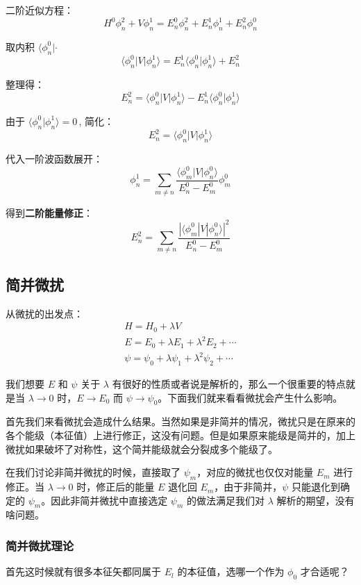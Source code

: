 二阶近似方程：
\[
H^0 \phi_n^2 + V \phi_n^1 = E_n^0 \phi_n^2 + E_n^1 \phi_n^1 + E_n^2 \phi_n^0
\]

取内积 \(\langle \phi_n^0 | \cdot \)
\[
\langle \phi_n^0 | V | \phi_n^1 \rangle = E_n^1\langle \phi_n^0 | \phi_n^1 \rangle + E_n^2
\]

整理得：
\[
E_n^2 = \langle \phi_n^0 | V | \phi_n^1 \rangle - E_n^1 \langle \phi_n^0 | \phi_n^1 \rangle
\]

由于 \(\boxed{\langle \phi_n^0 | \phi_n^1 \rangle = 0}\)\,, 简化：
\[
E_n^2 = \langle \phi_n^0 | V | \phi_n^1 \rangle
\]

代入一阶波函数展开：
\[
\phi_n^1 = \sum_{m \neq n} \frac{\langle \phi_m^0 | V | \phi_n^0 \rangle}{E_n^0 - E_m^0} \phi_m^0
\]

得到\textbf{二阶能量修正}：
\[
\boxed{E_n^2 = \sum_{m \neq n} \frac{|\langle \phi_m^0 | V | \phi_n^0 \rangle|^2}{E_n^0 - E_m^0}}
\]
\subsection{简并微扰}
从微扰的出发点：
\begin{equation*}
	\begin{array}{l}
		H=H_{0}+\lambda V \\
		E=E_{0}+\lambda E_{1}+\lambda^{2} E_{2}+\cdots \\
		\psi=\psi_{0}+\lambda \psi_{1}+\lambda^{2} \psi_{2}+\cdots
	\end{array}
\end{equation*}

我们想要 $E$ 和 $\psi$ 关于 $\lambda$ 有很好的性质或者说是解析的，那么一个很重要的特点就是当 $\lambda\to 0$ 时，$E\to E_{0}$ 而 $\psi\to \psi_{0}$。下面我们就来看看微扰会产生什么影响。

首先我们来看微扰会造成什么结果。当然如果是非简并的情况，微扰只是在原来的各个能级（本征值）上进行修正，这没有问题。但是如果原来能级是简并的，加上微扰如果破坏了对称性，这个简并能级就会分裂成多个能级了。

在我们讨论非简并微扰的时候，直接取了 $\psi_{m}$，对应的微扰也仅仅对能量 $E_{m}$ 进行修正。当 $\lambda\to 0$ 时，修正后的能量 $E$ 退化回 $E_{m}$，由于非简并，$\psi$ 只能退化到确定的 $\psi_{m}$。因此非简并微扰中直接选定 $\psi_{m}$ 的做法满足我们对 $\lambda$ 解析的期望，没有啥问题。

\subsubsection{简并微扰理论}
首先这时候就有很多本征矢都同属于 $E_{l}$ 的本征值，选哪一个作为 $\phi_{0}$ 才合适呢？

